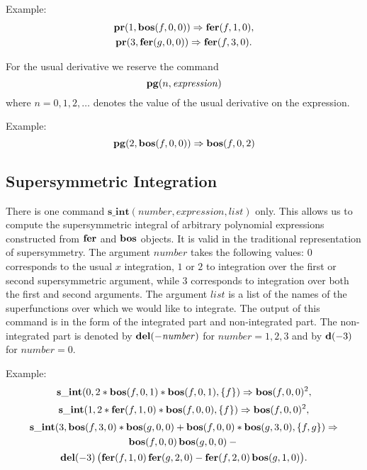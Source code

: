 {Example:
\begin{gather*}
  \mathbf{pr}(1,\mathbf{bos}(f,0,0)) \Rightarrow \mathbf{fer}(f,1,0), \\
  \mathbf{pr}(3,\mathbf{fer}(g,0,0)) \Rightarrow \mathbf{fer}(f,3,0).
\end{gather*}

For the usual derivative we reserve the command
\begin{equation*}
  \mathbf{pg}(n,\mathit{expression})
\end{equation*}
where $n=0,1,2,\ldots$ denotes the value of the usual derivative on
the expression.

Example:
\begin{equation*}
  \mathbf{pg}(2,\mathbf{bos}(f,0,0)) \Rightarrow \mathbf{bos}(f,0,2)
\end{equation*}

\subsection{Supersymmetric Integration}

There is one command
$\mathbf{s\_int}(\mathit{number},\mathit{expression},\mathit{list})$
only.  This allows us to compute the supersymmetric integral of
arbitrary polynomial expressions constructed from $\mathbf{fer}$ and $\mathbf{bos}$
objects.  It is valid in the traditional representation of
supersymmetry.  The argument $number$ takes the following values: $0$
corresponds to the usual $x$ integration, $1$ or $2$ to integration
over the first or second supersymmetric argument, while $3$
corresponds to integration over both the first and second arguments.
The argument $list$ is a list of the names of the superfunctions over
which we would like to integrate.  The output of this command is in
the form of the integrated part and non-integrated part.  The
non-integrated part is denoted by $\mathbf{del}(-\mathit{number})$ for
$\mathit{number} = 1,2,3$ and by $\mathbf{d}(-3)$ for $\mathit{number} = 0$.

Example:
\begin{equation*}
  \mathbf{s\_int}(0,2*\mathbf{bos}(f,0,1)*\mathbf{bos}(f,0,1),\{f\}) \Rightarrow \mathbf{bos}(f,0,0)^{2},
\end{equation*}
\begin{equation*}
  \mathbf{s\_int}(1,2*\mathbf{fer}(f,1,0)*\mathbf{bos}(f,0,0),\{f\}) \Rightarrow \mathbf{bos}(f,0,0)^{2},
\end{equation*}
\begin{multline*}
  \mathbf{s\_int}(3,\mathbf{bos}(f,3,0)*\mathbf{bos}(g,0,0)+\mathbf{bos}(f,0,0)*\mathbf{bos}(g,3,0),\{f,g\}) \Rightarrow \\
  \mathbf{bos}(f,0,0)\,\mathbf{bos}(g,0,0) - \mbox{} \\
  \mathbf{del}(-3)\,\big( \mathbf{fer}(f,1,0)\,\mathbf{fer}(g,2,0) - \mathbf{fer}(f,2,0)\,\mathbf{bos}(g,1,0) \big).
\end{multline*}

}
